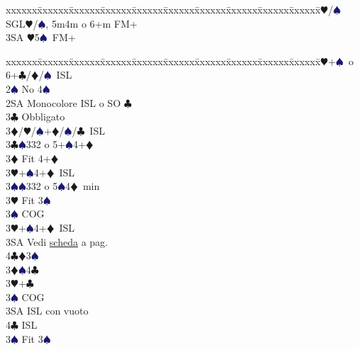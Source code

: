 \documentclass[a4paper,italian]{article}
\newcommand{\BC}{\textcolor{OliveGreen}{$\clubsuit$}}
\newcommand{\BD}{\textcolor{RedOrange}{$\vardiamondsuit$}}
\newcommand{\BH}{\textcolor{Red2}{$\varheartsuit${}}}
\newcommand{\BS}{\textcolor{MidnightBlue}{$\spadesuit${}}}
\newenvironment{bidtable}
{\begin{tabbing}

    xxxxxx\=xxxxxx\=xxxxxx\=xxxxxx\=xxxxxx\=xxxxxx\=xxxxxx\=xxxxxx\=xxxxxx\=xxxxxx\=\kill}
{\end{tabbing} }%
\begin{document}
\begin{multicols}{2}
\begin{bidtable}
                                            3\BH/\BS \> SGL\BH /\BS , 5m4m o 6+m FM+\\
                                            3SA \BH 5\BS\ FM+
                                        \end{bidtable}
                                        \bigbreak
                                        \begin{bidtable}
                                            2\BH {}+\BS\ o 6+\BC /\BD /\BS\ ISL\+\\
                                            2\BS \> No 4\BS \+\\
                                            2SA \> Monocolore ISL o SO \BC \+\\
                                            3\BC \> Obbligato\+\\
                                            3\BD/\BH/\BS {}+\BD /\BS /\BC\ ISL\-\-\\
                                            3\BC {}\BS 332 o 5+\BS 4+\BD \+\\
                                            3\BD \> Fit 4+\BD \+\\
                                            3\BH {}+\BS 4+\BD\ ISL\\
                                            3\BS {}\BS 332 o 5\BS 4\BD\ min\-\\
                                            3\BH \> Fit 3\BS \+\\
                                            3\BS \> COG\\
                                            3\BH {}+\BS 4+\BD\ ISL\-\\
                                            3SA\> Vedi \hyperref[Riapertura3SA]{scheda} a pag. \pageref{Riapertura3SA}\\
                                            4\BC {}\BD 3\BS \-\\
                                            3\BD {}\BS 4\BC \+\\
                                            3\BH {}+\BC \+\\
                                            3\BS \> COG\\
                                            3SA \> ISL con vuoto\\
                                            4\BC \> ISL\-\\
                                            3\BS \> Fit 3\BS \-\\

\end{bidtable}
\end{multicols}
\end{document}
